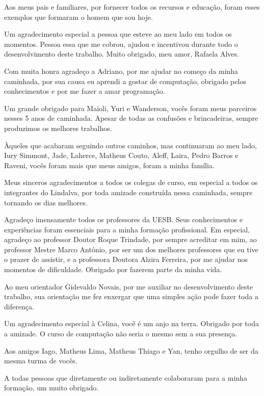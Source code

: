 \begin{agradecimentos}

  Aos meus pais e familiares, por fornecer todos os recursos e educação, foram esses exemplos que formaram o homem que sou hoje. 

  Um agradecimento especial a pessoa que esteve ao meu lado em todos os momentos. Pessoa essa que me cobrou, ajudou e incentivou durante todo o desenvolvimento deste trabalho. Muito obrigado, meu amor, Rafaela Alves.
  
  Com muita honra agradeço a Adriano, por me ajudar no começo da minha caminhada, por sua causa eu aprendi a gostar de computação, obrigado pelos conhecimentos e por me fazer a amar programação.
  
  Um grande obrigado para Maioli, Yuri e Wanderson, vocês foram meus parceiros nesses 5 anos de caminhada. Apesar de todas as confusões e brincadeiras, sempre produzimos os melhores trabalhos.

  Àqueles que acabaram seguindo outros caminhos, mas continuaram ao meu lado, Iury Simmont, Jade, Laherce, Matheus Couto, Aleff, Laira, Pedro Barros e Raveni, vocês foram mais que meus amigos, foram a minha família.
  
  Meus sinceros agradecimentos a todos os colegas de curso, em especial a todos os integrantes do Lindalva, por toda amizade construída nessa caminhada, sempre tornando os dias melhores.

  Agradeço imensamente todos os professores da UESB. Seus conhecimentos e experiências foram essenciais para a minha formação profissional. Em especial, agradeço ao professor Doutor Roque Trindade, por sempre acreditar em mim, ao professor Mestre Marco Antônio, por ser um dos melhores professores que eu tive o prazer de assistir, e a professora Doutora Alzira Ferreira, por me ajudar nos momentos de dificuldade. Obrigado por fazerem parte da minha vida.
  
  Ao meu orientador Gidevaldo Novais, por me auxiliar no desenvolvimento deste trabalho, sua orientação me fez enxergar que uma simples ação pode fazer toda a diferença.

  Um agradecimento especial à Celina, você é um anjo na terra. Obrigado por toda a amizade. O curso de computação não seria o mesmo sem a sua presença.

  Aos amigos Iago, Matheus Lima, Matheus Thiago e Yan, tenho orgulho de ser da mesma turma de vocês.
  
  A todas pessoas que diretamente ou indiretamente colaboraram para a minha formação, um muito obrigado.
\end{agradecimentos}
